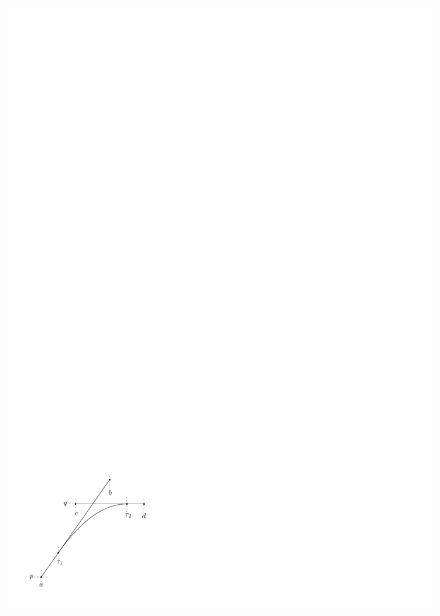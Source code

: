 \documentclass[a4paper]{report}
\theoremstyle{definition}
\theoremstyle{plain}
\begin{document}
\begin{figure}
\centering
\begin{minipage}{.45\textwidth}
  \centering
  \includegraphics[width=0.9\linewidth]{figures/motion/lemma_full_still}
  \label{fig:full_still}
\end{minipage}%
\hspace{1.0em}
\begin{minipage}{.45\textwidth}
  \centering

\end{minipage}
\end{figure}
\end{document}

